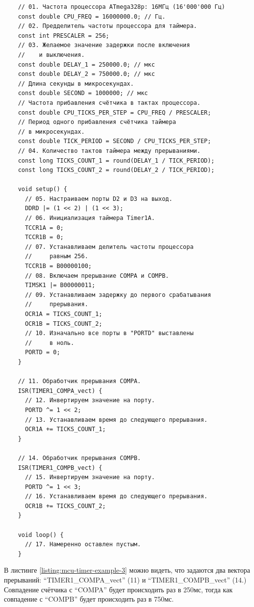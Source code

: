 \documentclass[../sparc.tex]{subfiles}
\begin{document}
\begin{listing}[ht]
  \begin{verbatim}
    // 01. Частота процессора ATmega328p: 16МГц (16'000'000 Гц)
    const double CPU_FREQ = 16000000.0; // Гц.
    // 02. Предделитель частоты процессора для таймера.
    const int PRESCALER = 256;
    // 03. Желаемое значение задержки после включения
    //    и выключения.
    const double DELAY_1 = 250000.0; // мкс
    const double DELAY_2 = 750000.0; // мкс
    // Длина секунды в микросекундах.
    const double SECOND = 1000000; // мкс
    // Частота прибавления счётчика в тактах процессора.
    const double CPU_TICKS_PER_STEP = CPU_FREQ / PRESCALER;
    // Период одного прибавления счётчика таймера
    // в микросекундах.
    const double TICK_PERIOD = SECOND / CPU_TICKS_PER_STEP;
    // 04. Количество тактов таймера между прерываниями.
    const long TICKS_COUNT_1 = round(DELAY_1 / TICK_PERIOD);
    const long TICKS_COUNT_2 = round(DELAY_2 / TICK_PERIOD);

    void setup() {
      // 05. Настраиваем порты D2 и D3 на выход.
      DDRD |= (1 << 2) | (1 << 3);
      // 06. Инициализация таймера Timer1A.
      TCCR1A = 0;
      TCCR1B = 0;
      // 07. Устанавливаем делитель частоты процессора
      //     равным 256.
      TCCR1B = B00000100;
      // 08. Включаем прерывание COMPA и COMPB.
      TIMSK1 |= B00000011;
      // 09. Устанавливаем задержку до первого срабатывания
      //     прерывания.
      OCR1A = TICKS_COUNT_1;
      OCR1B = TICKS_COUNT_2;
      // 10. Изначально все порты в "PORTD" выставлены
      //     в ноль.
      PORTD = 0;
    }

    // 11. Обработчик прерывания COMPA.
    ISR(TIMER1_COMPA_vect) {
      // 12. Инвертируем значение на порту.
      PORTD ^= 1 << 2;
      // 13. Устанавливаем время до следующего прерывания.
      OCR1A += TICKS_COUNT_1;
    }

    // 14. Обработчик прерывания COMPB.
    ISR(TIMER1_COMPB_vect) {
      // 15. Инвертируем значение на порту.
      PORTD ^= 1 << 3;
      // 16. Устанавливаем время до следующего прерывания.
      OCR1B += TICKS_COUNT_2;
    }

    void loop() {
      // 17. Намеренно оставлен пустым.
    }
  \end{verbatim}
  \caption{Пример мигания двумя светодиодами по переполнению таймера для Arduino
    Nano (ATmega328p.)}
  \label{listing:mcu-timer-example-3}
\end{listing}

В листинге \ref{listing:mcu-timer-example-3} можно видеть, что задаются два
вектора прерываний: ``TIMER1\_COMPA\_vect'' (11) и ``TIMER1\_COMPB\_vect'' (14.)
Совпадение счётчика с ``COMPA'' будет происходить раз в 250мс, тогда как
совпадение с ``COMPB'' будет происходить раз в 750мс.
\end{document}

